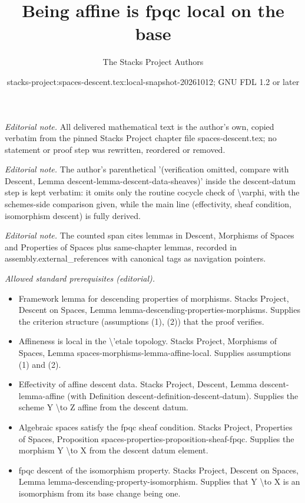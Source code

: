 \documentclass[10pt,a4paper]{amsart}
\title{Being affine is fpqc local on the base}
\author{The Stacks Project Authors}
\date{stacks-project:spaces-descent.tex:local-snapshot-20261012; GNU FDL 1.2 or later}
\theoremstyle{plain}
\theoremstyle{definition}
\theoremstyle{remark}
\numberwithin{equation}{subsection}
\begin{document}
\maketitle
\noindent\textit{Editorial note.} All delivered mathematical text is the author's own, copied verbatim from the pinned Stacks Project chapter file spaces-descent.tex; no statement or proof step was rewritten, reordered or removed.\par\medskip
\noindent\textit{Editorial note.} The author's parenthetical '(verification omitted, compare with Descent, Lemma descent-lemma-descent-data-sheaves)' inside the descent-datum step is kept verbatim: it omits only the routine cocycle check of \textbackslash{}varphi, with the schemes-side comparison given, while the main line (effectivity, sheaf condition, isomorphism descent) is fully derived.\par\medskip
\noindent\textit{Editorial note.} The counted span cites lemmas in Descent, Morphisms of Spaces and Properties of Spaces plus same-chapter lemmas, recorded in assembly.external\_references with canonical tags as navigation pointers.\par\medskip
\noindent\textit{Allowed standard prerequisites (editorial).}\begin{itemize}
\item Framework lemma for descending properties of morphisms. Stacks Project, Descent on Spaces, Lemma lemma-descending-properties-morphisms. Supplies the criterion structure (assumptions (1), (2)) that the proof verifies.
\item Affineness is local in the \textbackslash{}'etale topology. Stacks Project, Morphisms of Spaces, Lemma spaces-morphisms-lemma-affine-local. Supplies assumptions (1) and (2).
\item Effectivity of affine descent data. Stacks Project, Descent, Lemma descent-lemma-affine (with Definition descent-definition-descent-datum). Supplies the scheme Y \textbackslash{}to Z affine from the descent datum.
\item Algebraic spaces satisfy the fpqc sheaf condition. Stacks Project, Properties of Spaces, Proposition spaces-properties-proposition-sheaf-fpqc. Supplies the morphism Y \textbackslash{}to X from the descent datum element.
\item fpqc descent of the isomorphism property. Stacks Project, Descent on Spaces, Lemma lemma-descending-property-isomorphism. Supplies that Y \textbackslash{}to X is an isomorphism from its base change being one.
\end{itemize}\medskip
\end{document}
